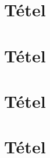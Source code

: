 \documentclass[10pt]{article}
\begin{document}
		

	\section{Tétel}
		
		

	\section{Tétel}
		
		

	\section{Tétel}
		
		

	\section{Tétel}
		
		

	
\end{document}
